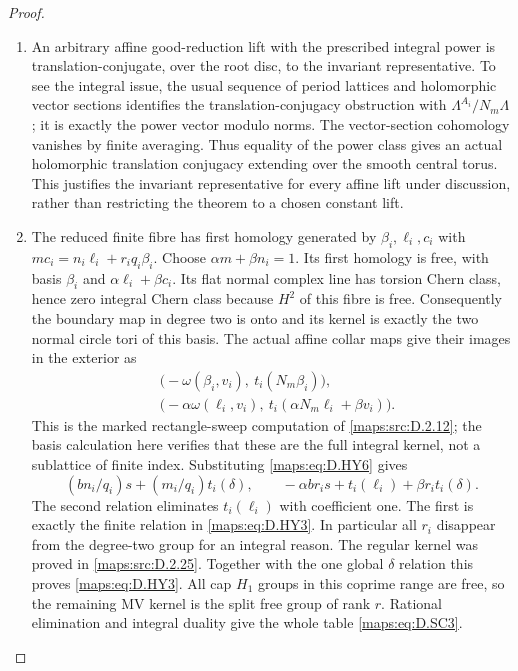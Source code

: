 \begin{proof}
\begin{enumerate}[label=\arabic*.,leftmargin=*]
\item An arbitrary affine good-reduction lift with the prescribed integral
power is translation-conjugate, over the root disc, to the invariant
representative. To see the integral issue, the usual sequence of
period lattices and holomorphic vector sections identifies the
translation-conjugacy obstruction with
$\Lambda^{A_i}/N_m\Lambda$; it is exactly the power vector modulo
norms. The vector-section cohomology vanishes by finite averaging.
Thus equality of the power class gives an actual holomorphic
translation conjugacy extending over the smooth central torus.
This justifies the invariant representative for every affine lift
under discussion, rather than restricting the theorem to a chosen
constant lift.

\item The reduced finite fibre has first homology generated by
$\beta_i,\ell_i,c_i$ with
$m c_i=n_i\ell_i+r_iq_i\beta_i$. Choose
$\alpha m+\beta n_i=1$. Its first homology is free, with basis
$\beta_i$ and $\alpha\ell_i+\beta c_i$. Its flat normal complex
line has torsion Chern class, hence zero integral Chern class because
$H^2$ of this fibre is free. Consequently the boundary map in degree
two is onto and its kernel is exactly the two normal circle tori
of this basis. The actual affine collar maps give their images in
the exterior as
\[
\begin{split}
 &\bigl(-\omega(\beta_i,v_i),\ t_i(N_m\beta_i)\bigr),\\
 &\bigl(-\alpha\omega(\ell_i,v_i),\
               t_i(\alpha N_m\ell_i+\beta v_i)\bigr).
\end{split}                                                  \tag{D.HY7}\label{maps:eq:D.HY7}
\]
This is the marked rectangle-sweep computation of \ref{maps:src:D.2.12}; the basis
calculation here verifies that these are the full integral kernel,
not a sublattice of finite index. Substituting \eqref{maps:eq:D.HY6} gives
\[
 (bn_i/q_i)s+(m_i/q_i)t_i(\delta),\qquad
 -\alpha b r_i s+t_i(\ell_i)+\beta r_i t_i(\delta).
\]
The second relation eliminates $t_i(\ell_i)$ with coefficient one.
The first is exactly the finite relation in \eqref{maps:eq:D.HY3}. In particular
all $r_i$ disappear from the degree-two group for an integral reason.
The regular kernel was proved in \ref{maps:src:D.2.25}. Together with the one
global $\delta$ relation this proves \eqref{maps:eq:D.HY3}. All cap $H_1$ groups
in this coprime range are free, so the remaining MV kernel is the
split free group of rank $r$. Rational elimination and integral
duality give the whole table \eqref{maps:eq:D.SC3}.


\end{enumerate}
\end{proof}
